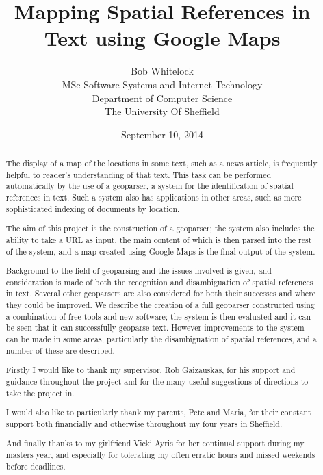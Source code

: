 \documentclass[12pt, a4paper]{report}
\title{Mapping Spatial References in Text using Google Maps}
\date{September 10, 2014}
\author{Bob Whitelock\\ MSc Software Systems and Internet Technology\\ Department of Computer Science\\ The University Of Sheffield}
\begin{document}
\maketitle

\begin{abstract}

The display of a map of the locations in some text, such as a news article, is frequently helpful to reader's understanding of that text. This task can be performed automatically by the use of a geoparser, a system for the identification of spatial references in text. Such a system also has applications in other areas, such as more sophisticated indexing of documents by location.

The aim of this project is the construction of a geoparser; the system also includes the ability to take a URL as input, the main content of which is then parsed into the rest of the system, and a map created using Google Maps is the final output of the system. 

Background to the field of geoparsing and the issues involved is given, and consideration is made of both the recognition and disambiguation of spatial references in text. Several other geoparsers are also considered for both their successes and where they could be improved. We describe the creation of a full geoparser constructed using a combination of free tools and new software; the system is then evaluated and it can be seen that it can successfully geoparse text. However improvements to the system can be made in some areas, particularly the disambiguation of spatial references, and a number of these are described.
	
\end{abstract}

\renewcommand{\abstractname}{Acknowledgements}
\begin{abstract}

Firstly I would like to thank my supervisor, Rob Gaizauskas, for his support and guidance throughout the project and for the many useful suggestions of directions to take the project in.

I would also like to particularly thank my parents, Pete and Maria, for their constant support both financially and otherwise throughout my four years in Sheffield.

And finally thanks to my girlfriend Vicki Ayris for her continual support during my masters year, and especially for tolerating my often erratic hours and missed weekends before deadlines.

\end{abstract}
\end{document}
